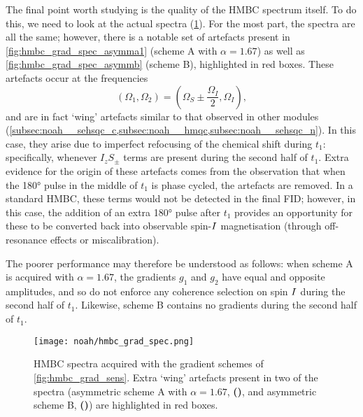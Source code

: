The final point worth studying is the quality of the HMBC spectrum itself.
To do this, we need to look at the actual spectra (\cref{fig:hmbc_grad_spec}).
For the most part, the spectra are all the same; however, there is a notable set of artefacts present in \cref{fig:hmbc_grad_spec_asymma1} (scheme A with $\alpha = 1.67$) as well as \cref{fig:hmbc_grad_spec_asymmb} (scheme B), highlighted in red boxes.
These artefacts occur at the frequencies
\begin{equation}
    \label{eq:hmbc_wing_artefacts}
    (\Omega_1, \Omega_2) = \left(\Omega_S \pm \frac{\Omega_I}{2}, \Omega_I\right),
\end{equation}
and are in fact `wing' artefacts similar to that observed in other modules (\cref{subsec:noah__sehsqc_c,subsec:noah__hmqc,subsec:noah__sehsqc_n}).
In this case, they arise due to imperfect refocusing of the \proton{} chemical shift during $t_1$: specifically, whenever $I_zS_\pm$ terms are present during the second half of $t_1$.
Extra evidence for the origin of these artefacts comes from the observation that when the \ang{180} pulse in the middle of $t_1$ is phase cycled, the artefacts are removed.
In a standard HMBC, these terms would not be detected in the final FID; however, in this case, the addition of an extra \ang{180} pulse after $t_1$ provides an opportunity for these to be converted back into observable spin-$I\/$ magnetisation (through off-resonance effects or miscalibration).

The poorer performance may therefore be understood as follows:
when scheme A is acquired with $\alpha = 1.67$, the gradients $g_1$ and $g_2$ have equal and opposite amplitudes, and so do not enforce any coherence selection on spin $I\/$ during the second half of $t_1$.
Likewise, scheme B contains no gradients during the second half of $t_1$.

\begin{figure}[htb]
    \centering
    \texttt{[image: noah/hmbc\_grad\_spec.png]}%
    {\label{fig:hmbc_grad_spec_symm}}%
    {\label{fig:hmbc_grad_spec_asymma1}}%
    {\label{fig:hmbc_grad_spec_asymma2}}%
    {\label{fig:hmbc_grad_spec_asymma3}}%
    {\label{fig:hmbc_grad_spec_asymmb}}%
    {\label{fig:hmbc_grad_spec_asymmc}}%
    \caption[HMBC spectra acquired with different gradient schemes]{
        HMBC spectra acquired with the gradient schemes of \cref{fig:hmbc_grad_sens}.
        Extra `wing' artefacts present in two of the spectra (asymmetric scheme A with $\alpha = 1.67$, \textbf{()}, and asymmetric scheme B, \textbf{()}) are highlighted in red boxes.
    }
    \label{fig:hmbc_grad_spec}
\end{figure}

